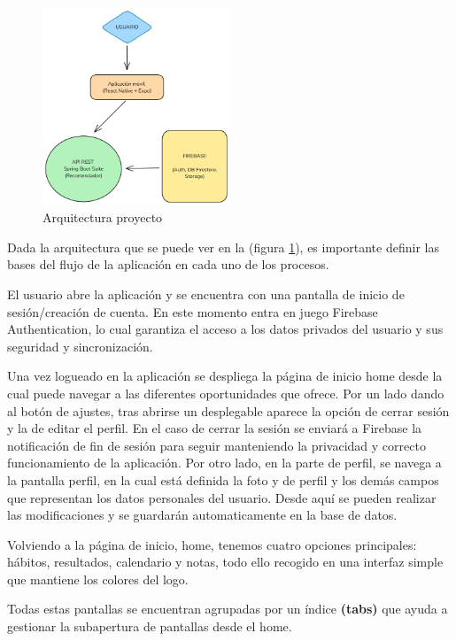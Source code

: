 \begin{figure}[h]
	\centering
	\includegraphics[width = 0.5\textwidth]{Imagenes/esquemas/arq.png}
	\caption{Arquitectura proyecto}
	\label{fig:arquitectura}
\end{figure}

Dada la arquitectura que se puede ver en la (figura \ref{fig:arquitectura}), es importante definir las bases del flujo de la aplicación en cada uno de los procesos.

El usuario abre la aplicación y se encuentra con una pantalla de inicio de sesión/creación de cuenta. En este momento entra en juego Firebase Authentication, lo cual garantiza el acceso a los datos privados del usuario y sus seguridad y sincronización.

Una vez logueado en la aplicación se despliega la página de inicio home desde la cual puede navegar a las diferentes oportunidades que ofrece. 
Por un lado dando al botón de ajustes, tras abrirse un desplegable aparece la opción de cerrar sesión y la de editar el perfil. En el caso de cerrar la sesión se enviará a Firebase la notificación de fin de sesión para seguir manteniendo la privacidad y correcto funcionamiento de la aplicación. 
Por otro lado, en la parte de perfil, se navega a la pantalla perfil, en la cual está definida la foto y de perfil y los demás campos que representan los datos personales del usuario. Desde aquí se pueden realizar las modificaciones y se guardarán automaticamente en la base de datos.

Volviendo a la página de inicio, home, tenemos cuatro opciones principales: hábitos, resultados, calendario y notas, todo ello recogido en una interfaz simple que mantiene los colores del logo.

Todas estas pantallas se encuentran agrupadas por un índice \textbf{(tabs)} que ayuda a gestionar la subapertura de pantallas desde el home.

